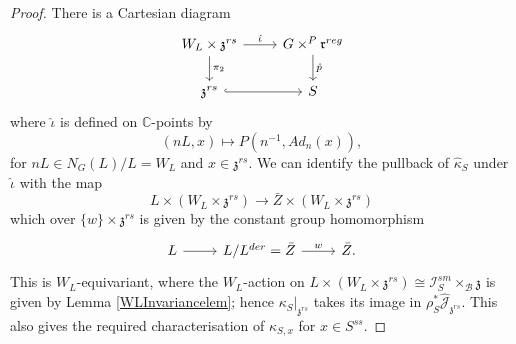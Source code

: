 \documentclass[10pt,a4paper]{amsart}
\begin{document}
\begin{proof}
There is a Cartesian diagram
\begin{equation}\label{CameralHom2eqn}
\begin{tikzcd}
W_L \times \mathfrak{z}^{rs} \arrow[d, "\pi_2"] \arrow[r, "\hat{\iota}"] & G \times^P \mathfrak{r}^{reg} \arrow[d, "\hat{p}"] \\
\mathfrak{z}^{rs} \arrow[r, hook]                                 & S                                                   
\end{tikzcd}
\end{equation}
where $\hat{\iota}$ is defined on $\mathbb{C}$-points by
\begin{equation}\label{CameralHom3eqn}
    (nL,x) \mapsto P(n^{-1},Ad_n(x)), 
\end{equation}
for $nL \in N_G(L)/L = W_L$ and $x \in \mathfrak{z}^{rs}$. We can identify the pullback of $\hat{\kappa}_S$ under $\hat{\iota}$ with the map
\begin{equation}\label{CameralHom4eqn}
    L \times (W_L \times \mathfrak{z}^{rs}) \rightarrow \bar{Z} \times (W_L \times \mathfrak{z}^{rs}) 
\end{equation}
which over $\{w\} \times \mathfrak{z}^{rs}$ is given by
the constant group homomorphism
\begin{equation}\label{CameralHom5eqn}
\begin{tikzcd}
L \arrow[r] & L/L^{der} = \bar{Z} \arrow[r, "w"] & \bar{Z}.
\end{tikzcd}  
\end{equation}
This is $W_L$-equivariant, where the $W_L$-action on $L \times (W_L \times \mathfrak{z}^{rs}) \cong \mathcal I_S^{sm} \times_{\mathcal B} \mathfrak{z}$ is given by Lemma \ref{WLInvariancelem}; hence $\kappa_S|_{\mathfrak{z}^{rs}}$ takes its image in $\rho_S^* \hat{\mathcal J}_{\mathfrak{z}^{rs}}$. This also gives the required characterisation of $\kappa_{S,x}$ for $x \in S^{ss}$.
\end{proof}
\end{document}
